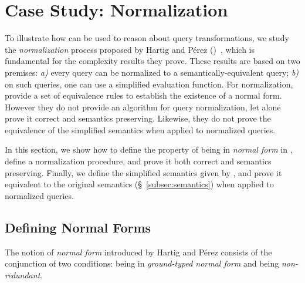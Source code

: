 \section{Case Study: Normalization}\label{sec:norm}


To illustrate how \gcoql can be used to reason about query transformations, we study the {\em normalization} process proposed by Hartig and Pérez (\HP)~\cite{gqlph}, which is fundamental for the complexity results they prove.
%
These results are based on two premises: {\em a)} every query can be normalized to a semantically-equivalent query; {\em b)} on such queries, one can use a simplified evaluation function. For normalization,  \HP provide a set of equivalence rules to establish the existence of a normal form. However they do not provide an algorithm for query normalization, let alone prove it correct and semantics preserving. Likewise, they do not prove the equivalence of the simplified semantics when applied to normalized queries.

In this section, we show how to define the property of being in \textit{normal form} in \gcoql, define a normalization procedure, and prove it both correct and semantics preserving. Finally, we define the simplified semantics given by \HP, and prove it equivalent to the original semantics (\S~\ref{subsec:semantics}) when applied to normalized queries.


\subsection{Defining Normal Forms}

The notion of \textit{normal form} introduced by Hartig and Pérez consists of the conjunction of two conditions: being in \textit{ground-typed normal form} and being \textit{non-redundant}.

